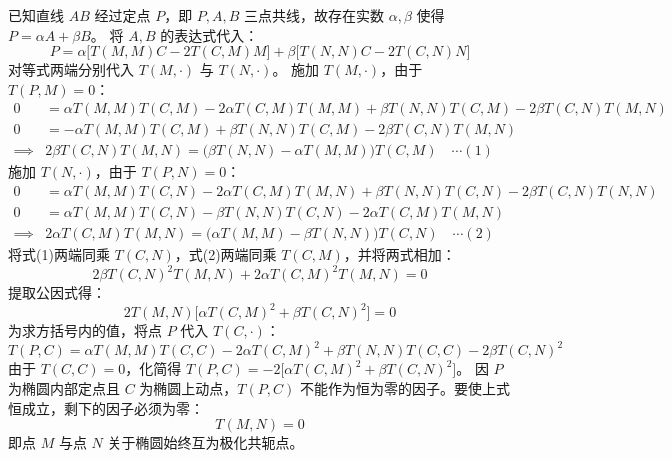 \begin{solution}
已知直线 $AB$ 经过定点 $P$，即 $P, A, B$ 三点共线，故存在实数 $\alpha, \beta$ 使得 $P = \alpha A + \beta B$。
将 $A, B$ 的表达式代入：
$$ P = \alpha \big[T(M,M)C - 2T(C,M)M\big] + \beta \big[T(N,N)C - 2T(C,N)N\big] $$
对等式两端分别代入 $T(M, \cdot)$ 与 $T(N, \cdot)$。
施加 $T(M, \cdot)$，由于 $T(P, M) = 0$：
\begin{align*}
0 &= \alpha T(M,M)T(C,M) - 2\alpha T(C,M)T(M,M) + \beta T(N,N)T(C,M) - 2\beta T(C,N)T(M,N) \\
0 &= -\alpha T(M,M)T(C,M) + \beta T(N,N)T(C,M) - 2\beta T(C,N)T(M,N) \\
\implies & 2\beta T(C,N)T(M,N) = \big(\beta T(N,N) - \alpha T(M,M)\big)T(C,M) \quad \cdots (1)
\end{align*}
施加 $T(N, \cdot)$，由于 $T(P, N) = 0$：
\begin{align*}
0 &= \alpha T(M,M)T(C,N) - 2\alpha T(C,M)T(M,N) + \beta T(N,N)T(C,N) - 2\beta T(C,N)T(N,N) \\
0 &= \alpha T(M,M)T(C,N) - \beta T(N,N)T(C,N) - 2\alpha T(C,M)T(M,N) \\
\implies & 2\alpha T(C,M)T(M,N) = \big(\alpha T(M,M) - \beta T(N,N)\big)T(C,N) \quad \cdots (2)
\end{align*}
将式(1)两端同乘 $T(C,N)$，式(2)两端同乘 $T(C,M)$，并将两式相加：
$$ 2\beta T(C,N)^2 T(M,N) + 2\alpha T(C,M)^2 T(M,N) = 0 $$
提取公因式得：
$$ 2 T(M,N) \big[ \alpha T(C,M)^2 + \beta T(C,N)^2 \big] = 0 $$
为求方括号内的值，将点 $P$ 代入 $T(C, \cdot)$：
$$ T(P,C) = \alpha T(M,M)T(C,C) - 2\alpha T(C,M)^2 + \beta T(N,N)T(C,C) - 2\beta T(C,N)^2 $$
由于 $T(C,C) = 0$，化简得 $T(P,C) = -2\big[ \alpha T(C,M)^2 + \beta T(C,N)^2 \big]$。
因 $P$ 为椭圆内部定点且 $C$ 为椭圆上动点，$T(P,C)$ 不能作为恒为零的因子。要使上式恒成立，剩下的因子必须为零：
$$ T(M,N) = 0 $$
即点 $M$ 与点 $N$ 关于椭圆始终互为极化共轭点。


\end{solution}
